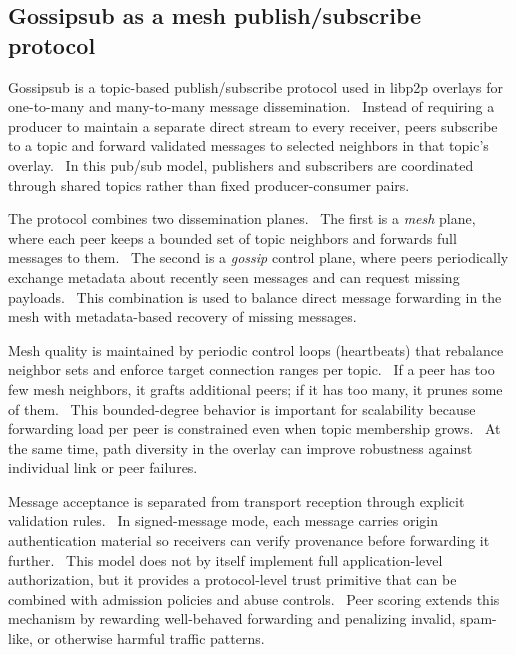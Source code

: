 \subsection{Gossipsub as a mesh publish/subscribe protocol}
Gossipsub is a topic-based publish/subscribe protocol used in libp2p overlays for one-to-many and many-to-many message dissemination.~\cite{SpecsPubsubGossipsub} Instead of requiring a producer to maintain a separate direct stream to every receiver, peers subscribe to a topic and forward validated messages to selected neighbors in that topic's overlay.~\cite{SpecsPubsubGossipsub} In this pub/sub model, publishers and subscribers are coordinated through shared topics rather than fixed producer-consumer pairs.~\cite{WhatPublishSubscribe}

The protocol combines two dissemination planes.~\cite{SpecsPubsubGossipsub} The first is a \textit{mesh} plane, where each peer keeps a bounded set of topic neighbors and forwards full messages to them.~\cite{SpecsPubsubGossipsub} The second is a \textit{gossip} control plane, where peers periodically exchange metadata about recently seen messages and can request missing payloads.~\cite{SpecsPubsubGossipsub} This combination is used to balance direct message forwarding in the mesh with metadata-based recovery of missing messages.~\cite{SpecsPubsubGossipsub}

Mesh quality is maintained by periodic control loops (heartbeats) that rebalance neighbor sets and enforce target connection ranges per topic.~\cite{SpecsPubsubGossipsub} If a peer has too few mesh neighbors, it grafts additional peers; if it has too many, it prunes some of them.~\cite{SpecsPubsubGossipsub} This bounded-degree behavior is important for scalability because forwarding load per peer is constrained even when topic membership grows.~\cite{SpecsPubsubGossipsub} At the same time, path diversity in the overlay can improve robustness against individual link or peer failures.~\cite{SpecsPubsubGossipsub}

Message acceptance is separated from transport reception through explicit validation rules.~\cite{SpecsPubsubGossipsub} In signed-message mode, each message carries origin authentication material so receivers can verify provenance before forwarding it further.~\cite{SpecsPubsubGossipsub} This model does not by itself implement full application-level authorization, but it provides a protocol-level trust primitive that can be combined with admission policies and abuse controls.~\cite{SecurityConsiderations} Peer scoring extends this mechanism by rewarding well-behaved forwarding and penalizing invalid, spam-like, or otherwise harmful traffic patterns.~\cite{SpecsPubsubGossipsub}

